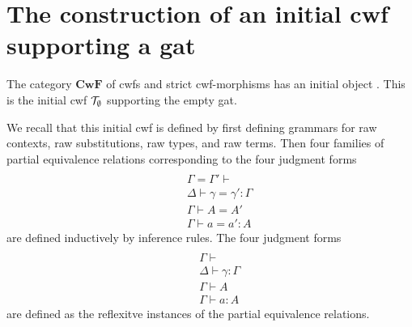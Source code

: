 \documentclass{lmcs}
\newtheorem{theorem}{Theorem}
\def\Cwf{\mathbf{CwF}}
\begin{document}

\section{The construction of an initial cwf supporting a gat}

The category $\Cwf$ of cwfs and strict cwf-morphisms has an initial object \cite{castellan}. This is the initial cwf ${\mathcal T}_\emptyset$ supporting the empty gat.

We recall that this initial cwf is defined by first defining grammars for raw contexts, raw substitutions, raw types, and raw terms. Then four families of partial equivalence relations corresponding to the four judgment forms
\begin{eqnarray*}
\\&&\Gamma = \Gamma' \vdash
\\&&\Delta \vdash \gamma = \gamma' : \Gamma
\\&&\Gamma \vdash A = A'
\\&&\Gamma \vdash a = a' : A
\end{eqnarray*}
are defined inductively by inference rules. The four judgment forms
\begin{eqnarray*}
\\&&\Gamma \vdash
\\&&\Delta \vdash \gamma : \Gamma
\\&&\Gamma \vdash A
\\&&\Gamma \vdash a : A
\end{eqnarray*}
are defined as the reflexitve instances of the partial equivalence relations.
\end{document}
